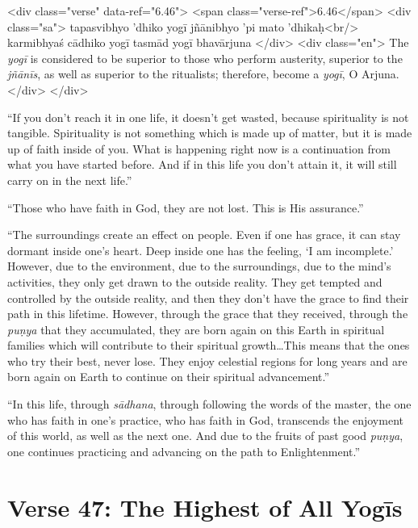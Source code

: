 \begin{html}
<div class="verse" data-ref="6.46">
  <span class="verse-ref">6.46</span>
  <div class="sa">
    tapasvibhyo ’dhiko yogī jñānibhyo ’pi mato ’dhikaḥ<br/>
    karmibhyaś cādhiko yogī tasmād yogī bhavārjuna
  </div>
  <div class="en">
    The \textit{yogī} is considered to be superior to those who perform austerity, superior to the \textit{jñānīs}, as well as superior to the ritualists; therefore, become a \textit{yogī}, O Arjuna.
  </div>
</div>
\end{html}


\enquote{If you don’t reach it in one life, it doesn’t get wasted, because spirituality is not tangible. Spirituality is not something which is made up of matter, but it is made up of faith inside of you. What is happening right now is a continuation from what you have started before. And if in this life you don’t attain it, it will still carry on in the next life.}

\enquote{Those who have faith in God, they are not lost. This is His assurance.}

\enquote{The surroundings create an effect on people. Even if one has grace, it can stay dormant inside one’s heart. Deep inside one has the feeling, \enquote{I am incomplete.} However, due to the environment, due to the surroundings, due to the mind’s activities, they only get drawn to the outside reality. They get tempted and controlled by the outside reality, and then they don’t have the grace to find their path in this lifetime. However, through the grace that they received, through the \textit{puṇya} that they accumulated, they are born again on this Earth in spiritual families which will contribute to their spiritual growth\ldots This means that the ones who try their best, never lose. They enjoy celestial regions for long years and are born again on Earth to continue on their spiritual advancement.}

\enquote{In this life, through \textit{sādhana}, through following the words of the master, the one who has faith in one’s practice, who has faith in God, transcends the enjoyment of this world, as well as the next one. And due to the fruits of past good \textit{puṇya}, one continues practicing and advancing on the path to Enlightenment.}

\section{Verse 47: The Highest of All Yogīs}\label{sec-verse-47-the-highest-of-all-yogis}


